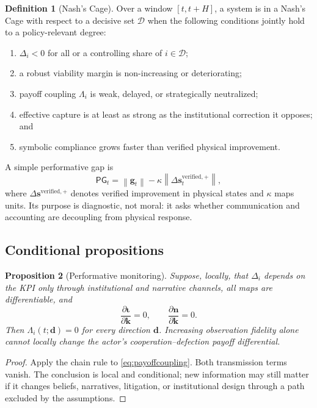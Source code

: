 \documentclass[11pt,a4paper]{article}
\numberwithin{equation}{section}
\theoremstyle{definition}
\newtheorem{definition}{Definition}[section]
\theoremstyle{plain}
\newtheorem{proposition}[definition]{Proposition}
\theoremstyle{remark}
\newcommand{\kpi}{\bm{k}}
\newcommand{\inst}{\bm{\iota}}
\newcommand{\narr}{\bm{n}}
\begin{document}
\begin{definition}[Nash's Cage]
Over a window $[t,t+H]$, a system is in a Nash's Cage with respect to a decisive set $\mathcal D$ when the following conditions jointly hold to a policy-relevant degree:
\begin{enumerate}[label=(C\arabic*)]
  \item $\Delta_i<0$ for all or a controlling share of $i\in\mathcal D$;
  \item a robust viability margin is non-increasing or deteriorating;
  \item payoff coupling $\Lambda_i$ is weak, delayed, or strategically neutralized;
  \item effective capture is at least as strong as the institutional correction it opposes; and
  \item symbolic compliance grows faster than verified physical improvement.
\end{enumerate}
\end{definition}

A simple performative gap is
\begin{equation}
\mathsf{PG}_t=
\left\|\bm{g}_t\right\|
-\kappa\left\|\Delta\bm{s}_t^{\mathrm{verified,+}}\right\|,
\label{eq:performativegap}
\end{equation}
where $\Delta\bm{s}^{\mathrm{verified,+}}$ denotes verified improvement in physical states and $\kappa$ maps units. Its purpose is diagnostic, not moral: it asks whether communication and accounting are decoupling from physical response.

\subsection{Conditional propositions}

\begin{proposition}[Performative monitoring]
Suppose, locally, that $\Delta_i$ depends on the KPI only through institutional and narrative channels, all maps are differentiable, and
\[
\frac{\partial \inst}{\partial \kpi}=0,
\qquad
\frac{\partial \narr}{\partial \kpi}=0.
\]
Then $\Lambda_i(t;\bm d)=0$ for every direction $\bm d$. Increasing observation fidelity alone cannot locally change the actor's cooperation--defection payoff differential.
\end{proposition}

\begin{proof}
Apply the chain rule to \cref{eq:payoffcoupling}. Both transmission terms vanish. The conclusion is local and conditional; new information may still matter if it changes beliefs, narratives, litigation, or institutional design through a path excluded by the assumptions.
\end{proof}
\end{document}
